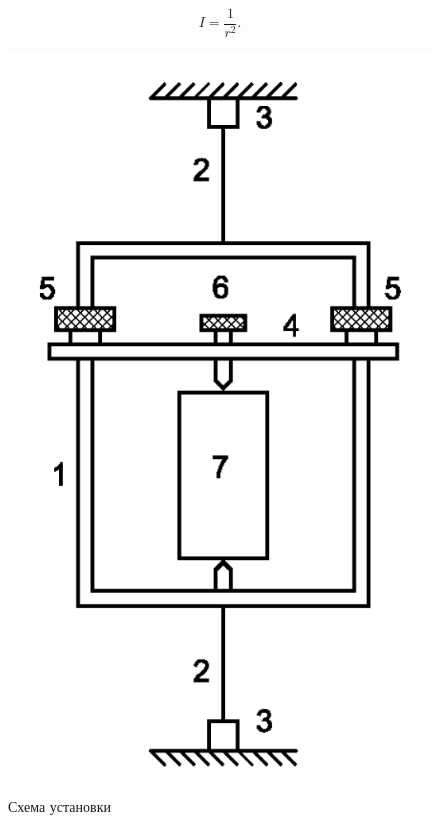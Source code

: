 \documentclass[a4paper,12pt]{article} %
\begin{document}
\begin{equation} I = \frac{1}{r^2}. \label{eq:2} \end{equation}

\begin{figure} [h] \center 
	\includegraphics[scale = 0.3]{124/рис. 2.png}
	\label{pic:2} \caption[Рис. 2]{Схема установки}

\end{figure}
\end{document}
